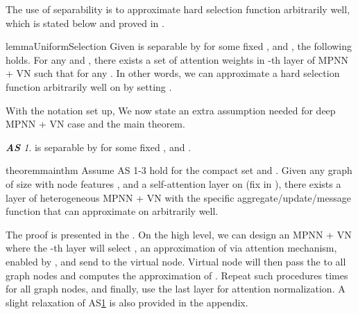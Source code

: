 \documentclass[nohyperref]{article}
\theoremstyle{plain}
\theoremstyle{definition}
\theoremstyle{remark}
\newtheorem{assumption}{\hspace{0pt}\bf AS\hspace{-0.075cm}}
\begin{document}
The use of  separability is to approximate hard selection function arbitrarily well, which is stated below and proved in . 
\begin{restatable}{lemma}{UniformSelection}
\label{lemma-uniform-selection}
Given  is  separable by  for some fixed ,  and , the following holds. For any  and , there exists a set of attention weights  in -th layer of MPNN + VN such that  for any . In other words, we can approximate a hard selection function  arbitrarily well on  by setting .  \end{restatable}



With the notation set up, We now state an extra assumption needed for deep MPNN + VN case and the main theorem. 
\begin{assumption}\label{AS-1} 
 is  separable by  for some fixed ,  and . 
\end{assumption}



\begin{restatable}{theorem}{mainthm}
\label{thm:constant-width}
Assume AS 1-3 hold for the compact set  and . Given any graph  of size  with node features , and a self-attention layer  on  (fix  in ), there exists a  layer of heterogeneous MPNN + VN with the specific aggregate/update/message function that can approximate  on  arbitrarily well. 
\end{restatable}

The proof is presented in the . On the high level, we can design an MPNN + VN where the -th layer will select , an approximation of  via attention mechanism, enabled by , and send  to the virtual node. Virtual node will then pass the  to all graph nodes and computes the approximation of . Repeat such procedures  times for all graph nodes, and finally, use the last layer for attention normalization. A slight relaxation of AS\ref{AS-1} is also provided in the appendix. 
\end{document}
